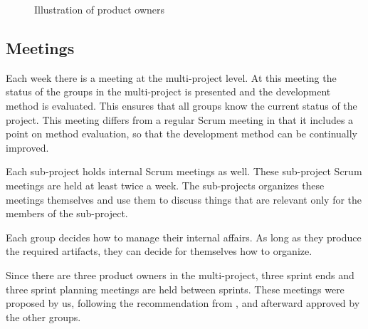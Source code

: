 \begin{figure}%
\centering
{}
\caption{Illustration of product owners}%
\label{fig:po_illu}%
\end{figure}

\subsection{Meetings}\label{sec:meetings}
Each week there is a meeting at the multi-project level. At this meeting the status of the groups in the multi-project is presented and the development method is evaluated. This ensures that all groups know the current status of the project. This meeting differs from a regular Scrum meeting in that it includes a point on method evaluation, so that the development method can be continually improved.

Each sub-project holds internal Scrum meetings as well. These sub-project Scrum meetings are held at least twice a week. The sub-projects organizes these meetings themselves and use them to discuss things that are relevant only for the members of the sub-project. 

Each group decides how to manage their internal affairs. As long as they produce the required artifacts, they can decide for themselves how to organize.

Since there are three product owners in the multi-project, three sprint ends and three sprint planning meetings are held between sprints. These meetings were proposed by us, following the recommendation from \textcite{bird_davies_2007}, and afterward approved by the other groups.

